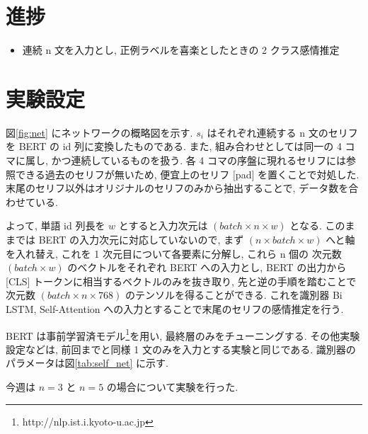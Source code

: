 \documentclass[twocolumn]{jarticle}     %
\begin{document}

\section{進捗}

\begin{itemize}
  \item 連続 n 文を入力とし, 正例ラベルを喜楽としたときの 2 クラス感情推定
\end{itemize}

\section{実験設定}
図\ref{fig:net} にネットワークの概略図を示す. ${s_i}$ はそれぞれ連続する n 文のセリフを BERT の id 列に変換したものである. また, 組み合わせとしては同一の 4 コマに属し, かつ連続しているものを扱う. 各 4 コマの序盤に現れるセリフには参照できる過去のセリフが無いため, 便宜上のセリフ $[$pad$]$ を置くことで対処した. 末尾のセリフ以外はオリジナルのセリフのみから抽出することで, データ数を合わせている.

よって, 単語 id 列長を $w$ とすると入力次元は $(batch \times n \times w)$ となる. このままでは BERT の入力次元に対応していないので, まず $(n \times batch \times w)$ へと軸を入れ替え, これを 1 次元目について各要素に分解し, これら n 個の 次元数 $(batch \times w)$ のベクトルをそれぞれ BERT への入力とし, BERT の出力から [CLS] トークンに相当するベクトルのみを抜き取り, 先と逆の手順を踏むことで次元数 $(batch \times n \times 768)$ のテンソルを得ることができる. これを識別器 Bi LSTM, Self-Attention への入力とすることで末尾のセリフの感情推定を行う.

BERT は事前学習済モデル\footnote{http://nlp.ist.i.kyoto-u.ac.jp}を用い, 最終層のみをチューニングする. その他実験設定などは, 前回までと同様 1 文のみを入力とする実験と同じである. 識別器のパラメータは図\ref{tab:self_net} に示す.

今週は $n = 3$ と $n = 5$ の場合について実験を行った.
\end{document}
